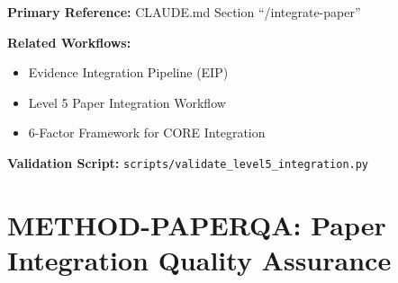 %
%
%

%
%
%
%

\begin{tcolorbox}[colback=purple!5!white, colframe=purple!75!black,
    title=Chapter Linkage]

\textbf{Primary Reference:} CLAUDE.md Section ``/integrate-paper''

\textbf{Related Workflows:}
\begin{itemize}[nosep]
\item Evidence Integration Pipeline (EIP)
\item Level 5 Paper Integration Workflow
\item 6-Factor Framework for CORE Integration
\end{itemize}

\textbf{Validation Script:} \texttt{scripts/validate\_level5\_integration.py}

\end{tcolorbox}

\chapter{METHOD-PAPERQA: Paper Integration Quality Assurance}
\label{app:paperqa}


